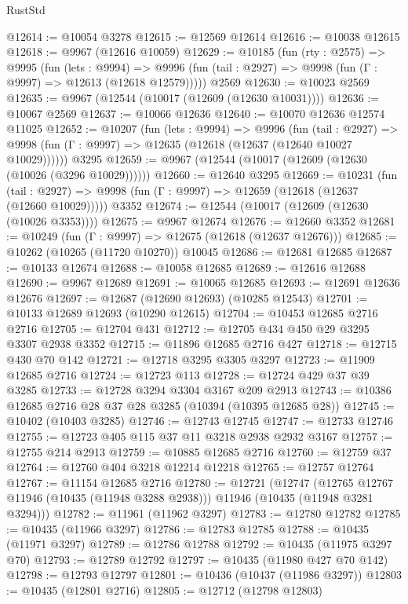 \begin{lexlean}{RustStd}
\begin{coremodule}
{\begin{coremodule}
{{{{{{{{{{{{{{{{{{{{{{{{{{{{{{{{{{{{{{{{{{{{{{{{{{{{{{{{{{{{{{{{{{{{{{{{{{{{{{@12614 := @10054 @3278
@12615 := @12569 @12614
@12616 := @10038 @12615
@12618 := @9967 (@12616 @10059)
@12629 := @10185
    (fun (rty : @2575) =>
    @9995
      (fun (lets : @9994) =>
      @9996 (fun (tail : @2927) => @9998 (fun (Γ : @9997) => @12613 (@12618 @12579)))))
    @2569
@12630 := @10023 @2569
@12635 := @9967 (@12544 (@10017 (@12609 (@12630 @10031))))
@12636 := @10067 @2569
@12637 := @10066 @12636
@12640 := @10070 @12636 @12574 @11025
@12652 := @10207
    (fun (lets : @9994) =>
    @9996
      (fun (tail : @2927) =>
      @9998 (fun (Γ : @9997) => @12635 (@12618 (@12637 (@12640 @10027 @10029))))))
    @3295
@12659 := @9967 (@12544 (@10017 (@12609 (@12630 (@10026 (@3296 @10029))))))
@12660 := @12640 @3295
@12669 := @10231
    (fun (tail : @2927) => @9998 (fun (Γ : @9997) => @12659 (@12618 (@12637 (@12660 @10029)))))
    @3352
@12674 := @12544 (@10017 (@12609 (@12630 (@10026 @3353))))
@12675 := @9967 @12674
@12676 := @12660 @3352
@12681 := @10249 (fun (Γ : @9997) => @12675 (@12618 (@12637 @12676)))
@12685 := @10262 (@10265 (@11720 @10270)) @10045
@12686 := @12681 @12685
@12687 := @10133 @12674
@12688 := @10058 @12685
@12689 := @12616 @12688
@12690 := @9967 @12689
@12691 := @10065 @12685
@12693 := @12691 @12636 @12676
@12697 := @12687 (@12690 @12693) (@10285 @12543)
@12701 := @10133 @12689 @12693 (@10290 @12615)
@12704 := @10453 @12685 @2716 @2716
@12705 := @12704 @431
@12712 := @12705 @434 @450 @29 @3295 @3307 @2938 @3352
@12715 := @11896 @12685 @2716 @427
@12718 := @12715 @430 @70 @142
@12721 := @12718 @3295 @3305 @3297
@12723 := @11909 @12685 @2716
@12724 := @12723 @113
@12728 := @12724 @429 @37 @39 @3285
@12733 := @12728 @3294 @3304 @3167 @209 @2913
@12743 := @10386 @12685 @2716 @28 @37 @28 @3285 (@10394 (@10395 @12685 @28))
@12745 := @10402 (@10403 @3285)
@12746 := @12743 @12745
@12747 := @12733 @12746
@12755 := @12723 @405 @115 @37 @11 @3218 @2938 @2932 @3167
@12757 := @12755 @214 @2913
@12759 := @10885 @12685 @2716
@12760 := @12759 @37
@12764 := @12760 @404 @3218 @12214 @12218
@12765 := @12757 @12764
@12767 := @11154 @12685 @2716
@12780 := @12721
    (@12747
      (@12765 @12767 @11946 (@10435 (@11948 @3288 @2938)))
      @11946
      (@10435 (@11948 @3281 @3294)))
@12782 := @11961 (@11962 @3297)
@12783 := @12780 @12782
@12785 := @10435 (@11966 @3297)
@12786 := @12783 @12785
@12788 := @10435 (@11971 @3297)
@12789 := @12786 @12788
@12792 := @10435 (@11975 @3297 @70)
@12793 := @12789 @12792
@12797 := @10435 (@11980 @427 @70 @142)
@12798 := @12793 @12797
@12801 := @10436 (@10437 (@11986 @3297))
@12803 := @10435 (@12801 @2716)
@12805 := @12712 (@12798 @12803)
}}}}}}}}}}}}}}}}}}}}}}}}}}}}}}}}}}}}}}}}}}}}}}}}}}}}}}}}}}}}}}}}}}}}}}}}}}}}}}
\end{coremodule}}
\end{coremodule}
\end{lexlean}
